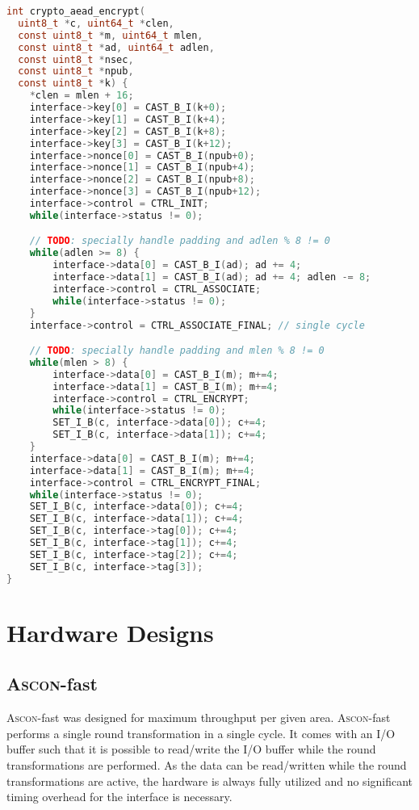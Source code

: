 \documentclass[runningheads]{llncs}
\begin{document}
\begin{lstlisting}[float=htb,language=c,caption={Simple way of using the hardware to authenticate and encrypt data.},label=lst:c_auth_enc,basicstyle=\footnotesize\ttfamily]
int crypto_aead_encrypt(
  uint8_t *c, uint64_t *clen,
  const uint8_t *m, uint64_t mlen,
  const uint8_t *ad, uint64_t adlen,
  const uint8_t *nsec,
  const uint8_t *npub,
  const uint8_t *k) {
    *clen = mlen + 16;
    interface->key[0] = CAST_B_I(k+0);
    interface->key[1] = CAST_B_I(k+4);
    interface->key[2] = CAST_B_I(k+8);
    interface->key[3] = CAST_B_I(k+12);
    interface->nonce[0] = CAST_B_I(npub+0);
    interface->nonce[1] = CAST_B_I(npub+4);
    interface->nonce[2] = CAST_B_I(npub+8);
    interface->nonce[3] = CAST_B_I(npub+12);
    interface->control = CTRL_INIT;
    while(interface->status != 0);

    // TODO: specially handle padding and adlen % 8 != 0
    while(adlen >= 8) {
        interface->data[0] = CAST_B_I(ad); ad += 4;
        interface->data[1] = CAST_B_I(ad); ad += 4; adlen -= 8;
        interface->control = CTRL_ASSOCIATE;
        while(interface->status != 0);
    }
    interface->control = CTRL_ASSOCIATE_FINAL; // single cycle

    // TODO: specially handle padding and mlen % 8 != 0
    while(mlen > 8) {
        interface->data[0] = CAST_B_I(m); m+=4;
        interface->data[1] = CAST_B_I(m); m+=4;
        interface->control = CTRL_ENCRYPT;
        while(interface->status != 0);
        SET_I_B(c, interface->data[0]); c+=4;
        SET_I_B(c, interface->data[1]); c+=4;
    }
    interface->data[0] = CAST_B_I(m); m+=4;
    interface->data[1] = CAST_B_I(m); m+=4;
    interface->control = CTRL_ENCRYPT_FINAL;
    while(interface->status != 0);
    SET_I_B(c, interface->data[0]); c+=4;
    SET_I_B(c, interface->data[1]); c+=4;
    SET_I_B(c, interface->tag[0]); c+=4;
    SET_I_B(c, interface->tag[1]); c+=4;
    SET_I_B(c, interface->tag[2]); c+=4;
    SET_I_B(c, interface->tag[3]); 
}
\end{lstlisting}

\section{Hardware Designs}

\subsection{\textsc{Ascon}-fast}

\textsc{Ascon}-fast was designed for maximum throughput per given area.
\textsc{Ascon}-fast performs a single round transformation in a single cycle. It comes with an I/O buffer such that it is possible to read/write the I/O buffer while the round transformations are performed. As the data can be read/written while the round transformations are active, the hardware is always fully utilized and no significant timing overhead for the interface is necessary. 
\end{document}

